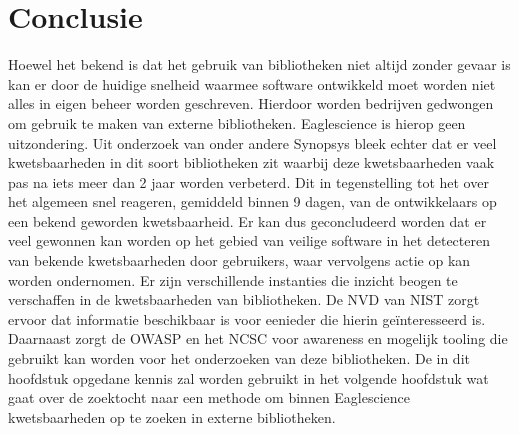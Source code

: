 \section{Conclusie}\label{sec:soupTheorieconclusie}
Hoewel het bekend is dat het gebruik van bibliotheken niet altijd zonder gevaar is kan er door de huidige snelheid waarmee software ontwikkeld moet worden niet alles in eigen beheer worden geschreven. Hierdoor worden bedrijven gedwongen om gebruik te maken van externe bibliotheken. Eaglescience is hierop geen uitzondering. Uit onderzoek van onder andere Synopsys bleek echter dat er veel kwetsbaarheden in dit soort bibliotheken zit waarbij deze kwetsbaarheden vaak pas na iets meer dan 2 jaar worden verbeterd. Dit in tegenstelling tot het over het algemeen snel reageren, gemiddeld binnen 9 dagen, van de ontwikkelaars op een bekend geworden kwetsbaarheid. Er kan dus geconcludeerd worden dat er veel gewonnen kan worden op het gebied van veilige software in het detecteren van bekende kwetsbaarheden door gebruikers, waar vervolgens actie op kan worden ondernomen. Er zijn verschillende instanties die inzicht beogen te verschaffen in de kwetsbaarheden van bibliotheken. De NVD van NIST zorgt ervoor dat informatie beschikbaar is voor eenieder die hierin geïnteresseerd is. Daarnaast zorgt de OWASP  en het NCSC voor awareness en mogelijk tooling die gebruikt kan worden voor het onderzoeken van deze bibliotheken. De in dit hoofdstuk opgedane kennis zal worden gebruikt in het volgende hoofdstuk wat gaat over de zoektocht naar een methode om binnen Eaglescience kwetsbaarheden op te zoeken in externe bibliotheken.

